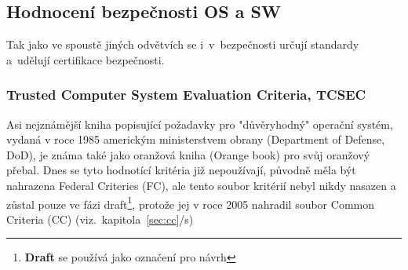 \documentclass[a4paper,12pt]{article}
\newcommand{\odkazNaKapitolu}[1]{(viz.~kapitola~\ref{#1}/s\pageref{#1})}
\renewcommand{\b}[1]{\textbf{#1}} %
\begin{document}


\subsection{Hodnocení bezpečnosti OS a SW}

Tak jako ve spoustě jiných odvětvích se i~v~bezpečnosti určují standardy a~udělují certifikace bezpečnosti.

\subsubsection{Trusted Computer System Evaluation Criteria, TCSEC} \label{sec:TCSEC}

Asi nejznámější kniha popisující požadavky pro "důvěryhodný" operační systém, vydaná v roce 1985 americkým ministerstvem obrany (Department of Defense, DoD), je známa také jako oranžová kniha (Orange book) pro svůj oranžový přebal. Dnes se tyto hodnotící kritéria již nepoužívají, původně měla být nahrazena Federal Criteries (FC), ale tento soubor kritérií nebyl nikdy nasazen a zůstal pouze ve fázi draft\footnote{\b{Draft} se používá jako označení pro návrh}, protože jej v roce 2005 nahradil soubor Common Criteria (CC) \odkazNaKapitolu{sec:cc}\\
\end{document}
